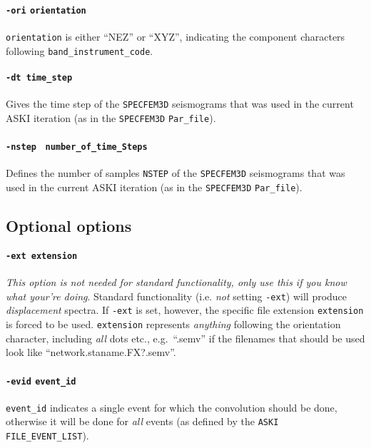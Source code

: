 \documentclass[12pt,a4paper]{article}
\newcommand{\lcode}[1]{\nolinkurl{#1}}
\newcommand{\ASKI}{ {\ttfamily ASKI} }
\begin{document}
\paragraph{\lcode{-ori} \lcode{orientation}}
\lcode{orientation} is either ``NEZ'' or ``XYZ'', indicating the component characters following 
\lcode{band_instrument_code}.

\paragraph{\lcode{-dt time_step}}
Gives the time step of the \lcode{SPECFEM3D} seismograms that was used in the current \ASKI{} 
iteration (as in the \lcode{SPECFEM3D} \lcode{Par_file}).

\paragraph{\lcode{-nstep} \lcode{ number_of_time_Steps}}
Defines the number of samples \lcode{NSTEP} of the \lcode{SPECFEM3D} seismograms that was used 
in the current \ASKI{} iteration (as in the \lcode{SPECFEM3D} \lcode{Par_file}).


\subsection*{Optional options}
\paragraph{\lcode{-ext extension}}
\emph{This option is not needed for standard functionality, only use this if you know what your're doing}.
Standard functionality (i.e. \emph{not} setting \lcode{-ext}) will produce \emph{displacement} spectra.
If \lcode{-ext} is set, however, the specific file extension \lcode{extension} is forced to be used. 
\lcode{extension} represents \emph{anything} following the orientation character, including 
\emph{all} dots etc., e.g.\ ``.semv'' if the filenames that should be used look like ``network.staname.FX?.semv''.

\paragraph{\lcode{-evid} \lcode{event_id}}
\lcode{event_id} indicates a single event for which the convolution should be done, otherwise it will be done
for \emph{all} events (as defined by the \lcode{ASKI} \lcode{ FILE_EVENT_LIST}).
\end{document}
